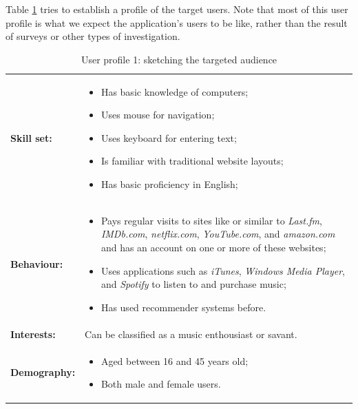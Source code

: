 Table \ref{tab:user_profile1} tries to establish a profile of the target users. Note that most of this user profile is what we expect the application's users to be like, rather than the result of surveys or other types of investigation.

\begin{table}[h]
\caption{User profile 1: sketching the targeted audience}
\begin{center}
	\begin{tabular}{ l p{300px} } %
		\hline
		\textbf{Skill set:}		&
		
		\begin{itemize}
			\item Has basic knowledge of computers;
			\item Uses mouse for navigation;
			\item Uses keyboard for entering text;
			\item Is familiar with traditional website layouts;
			\item Has basic proficiency in English;
		\end{itemize}
		 \\
		
		\textbf{Behaviour:}		&
		
		\begin{itemize}
			\item Pays regular visits to sites like or similar to \emph{Last.fm}, \emph{IMDb.com}, \emph{netflix.com}, \emph{YouTube.com}, and \emph{amazon.com} and has an account on one or more of these websites;
			\item Uses applications such as \emph{iTunes}, \emph{Windows Media Player}, and \emph{Spotify} to listen to and purchase music;
			\item Has used recommender systems before.
		\end{itemize}
		\\
		
		\textbf{Interests:}		& Can be classified as a music enthousiast or savant. \\
		\textbf{Demography:}	&
		\begin{itemize}
			\item Aged between 16 and 45 years old;
			\item Both male and female users.
		\end{itemize}
		\\
		
		\hline
	\end{tabular}
\end{center}
\label{tab:user_profile1}
\end{table}


